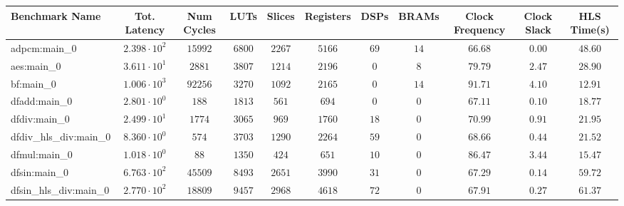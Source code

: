 \begin{tabular}{|l|c|c|c|c|c|c|c|c|c|c|}
\hline
Benchmark Name          & Tot. Latency           & Num Cycles & LUTs      & Slices    & Registers & DSPs    & BRAMs   & Clock Frequency & Clock Slack & HLS Time(s) \\
\hline
adpcm:main\_0           & $ 2.398 \cdot 10^{2} $ & $ 15992  $ & $ 6800  $ & $ 2267  $ & $ 5166  $ & $ 69  $ & $ 14  $ & $ 66.68       $ & $ 0.00    $ & $ 48.60   $ \\
aes:main\_0             & $ 3.611 \cdot 10^{1} $ & $ 2881   $ & $ 3807  $ & $ 1214  $ & $ 2196  $ & $ 0   $ & $ 8   $ & $ 79.79       $ & $ 2.47    $ & $ 28.90   $ \\
bf:main\_0              & $ 1.006 \cdot 10^{3} $ & $ 92256  $ & $ 3270  $ & $ 1092  $ & $ 2165  $ & $ 0   $ & $ 14  $ & $ 91.71       $ & $ 4.10    $ & $ 12.91   $ \\
dfadd:main\_0           & $ 2.801 \cdot 10^{0} $ & $ 188    $ & $ 1813  $ & $ 561   $ & $ 694   $ & $ 0   $ & $ 0   $ & $ 67.11       $ & $ 0.10    $ & $ 18.77   $ \\
dfdiv:main\_0           & $ 2.499 \cdot 10^{1} $ & $ 1774   $ & $ 3065  $ & $ 969   $ & $ 1760  $ & $ 18  $ & $ 0   $ & $ 70.99       $ & $ 0.91    $ & $ 21.95   $ \\
dfdiv\_hls\_div:main\_0 & $ 8.360 \cdot 10^{0} $ & $ 574    $ & $ 3703  $ & $ 1290  $ & $ 2264  $ & $ 59  $ & $ 0   $ & $ 68.66       $ & $ 0.44    $ & $ 21.52   $ \\
dfmul:main\_0           & $ 1.018 \cdot 10^{0} $ & $ 88     $ & $ 1350  $ & $ 424   $ & $ 651   $ & $ 10  $ & $ 0   $ & $ 86.47       $ & $ 3.44    $ & $ 15.47   $ \\
dfsin:main\_0           & $ 6.763 \cdot 10^{2} $ & $ 45509  $ & $ 8493  $ & $ 2651  $ & $ 3990  $ & $ 31  $ & $ 0   $ & $ 67.29       $ & $ 0.14    $ & $ 59.72   $ \\
dfsin\_hls\_div:main\_0 & $ 2.770 \cdot 10^{2} $ & $ 18809  $ & $ 9457  $ & $ 2968  $ & $ 4618  $ & $ 72  $ & $ 0   $ & $ 67.91       $ & $ 0.27    $ & $ 61.37   $ \\

\end{tabular}
